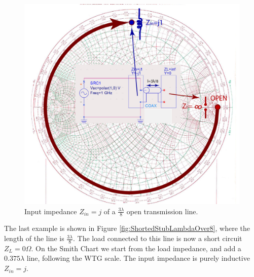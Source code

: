 \documentclass{ximera}
\begin{document}
\begin{figure}[htbp]
\begin{center}
\includegraphics[scale=1]{../jpg/openstub2-01.jpg}
\end{center}
\caption{Input impedance $Z_{in}=j$  of a $\frac{3 \lambda}{8}$ open transmission line.}
\label{fig:OpenStub3LambdaOver8}
\end{figure}


The last example is shown in Figure \ref{fig:ShortedStubLambdaOver8}, where the length of the line is  $\frac{3 \lambda}{8}$. The load connected to this line is now a short circuit $Z_L=0 \Omega$. On the Smith Chart we start from the load impedance, and add a $0.375 \lambda$ line, following the WTG scale. The input impedance is purely inductive $Z_{in}=j$.
\end{document}
